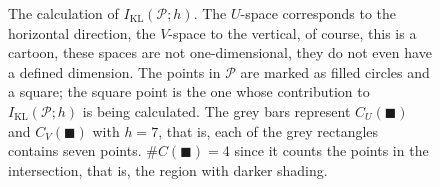 \documentclass[12pt]{article}
\begin{document}
\begin{figure}
\begin{center}

\end{center}
\caption{The calculation of $I_{\text{KL}}(\mathcal{P};h)$. The
  $U$-space corresponds to the horizontal direction, the $V$-space to
  the vertical, of course, this is a cartoon, these spaces are not
  one-dimensional, they do not even have a defined dimension. The
  points in $\mathcal{P}$ are marked as filled circles and a square;
  the square point is the one whose contribution to
  $I_{\text{KL}}(\mathcal{P};h)$ is being calculated. The grey bars
  represent $C_U(\blacksquare)$ and $C_V(\blacksquare)$ with $h=7$,
  that is, each of the grey rectangles contains seven points.
  $\#C(\blacksquare)=4$ since it counts the points in the
  intersection, that is, the region with darker
  shading.\label{fig_region}}
\end{figure}
\end{document}
